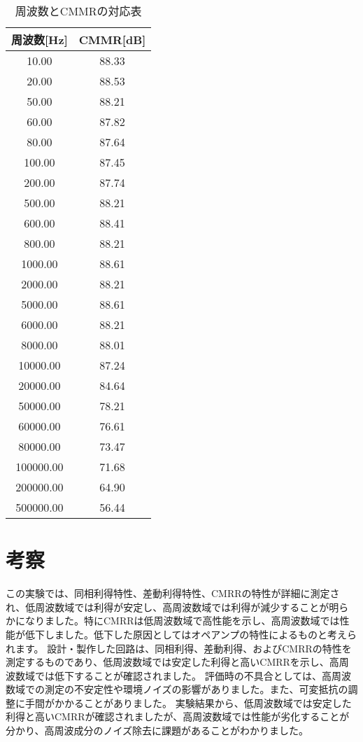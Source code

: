 \documentclass[a4paper,11pt,xelatex,ja=standard]{bxjsarticle}
\begin{document}
        \begin{table}[H]
            \centering
            \begin{tabular}{|c|c|}
                \hline
                周波数[Hz] & CMMR[dB] \\
                \hline
                10.00 & 88.33 \\
                20.00 & 88.53 \\
                50.00 & 88.21 \\
                60.00 & 87.82 \\
                80.00 & 87.64 \\
                100.00 & 87.45 \\
                200.00 & 87.74 \\
                500.00 & 88.21 \\
                600.00 & 88.41 \\
                800.00 & 88.21 \\
                1000.00 & 88.61 \\
                2000.00 & 88.21 \\
                5000.00 & 88.61 \\
                6000.00 & 88.21 \\
                8000.00 & 88.01 \\
                10000.00 & 87.24 \\
                20000.00 & 84.64 \\
                50000.00 & 78.21 \\
                60000.00 & 76.61 \\
                80000.00 & 73.47 \\
                100000.00 & 71.68 \\
                200000.00 & 64.90 \\
                500000.00 & 56.44 \\
                \hline
            \end{tabular}
            \caption{周波数とCMMRの対応表}
        \end{table}


\section{考察}

    この実験では、同相利得特性、差動利得特性、CMRRの特性が詳細に測定され、低周波数域では利得が安定し、高周波数域では利得が減少することが明らかになりました。特にCMRRは低周波数域で高性能を示し、高周波数域では性能が低下しました。低下した原因としてはオペアンプの特性によるものと考えられます。
    設計・製作した回路は、同相利得、差動利得、およびCMRRの特性を測定するものであり、低周波数域では安定した利得と高いCMRRを示し、高周波数域では低下することが確認されました。
    評価時の不具合としては、高周波数域での測定の不安定性や環境ノイズの影響がありました。また、可変抵抗の調整に手間がかかることがありました。
    実験結果から、低周波数域では安定した利得と高いCMRRが確認されましたが、高周波数域では性能が劣化することが分かり、高周波成分のノイズ除去に課題があることがわかりました。
\end{document}
